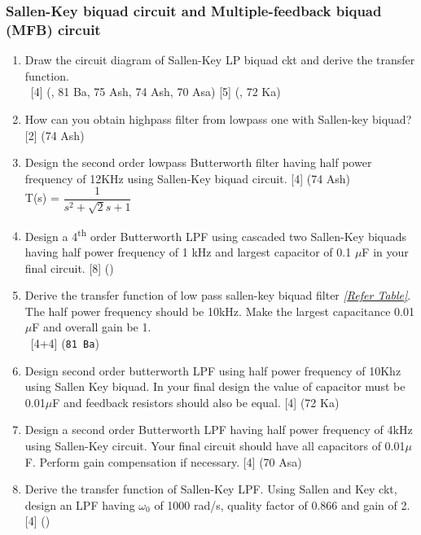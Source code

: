 \documentclass[12pt]{article}
\newcommand{\w}{\(\omega\)}
\newcommand{\enter}{\\\textcolor{white}{1}}
\newcommand{\super}[1]{\textsuperscript{#1}}
\begin{document}
		\subsubsection{Sallen-Key biquad circuit and Multiple-feedback biquad (MFB) circuit}
			\begin{enumerate}
				\item Draw the circuit diagram of Sallen-Key LP biquad ckt and derive the transfer function.
				\enter\hfill [4] (, 81 Ba, 75 Ash, 74 Ash, 70 Asa) [5] (, 72 Ka)

				\item How can you obtain highpass filter from lowpass one with Sallen-key biquad? \hfill [2] (74 Ash)
				
				\item Design the second order lowpass Butterworth filter having half power frequency of 12KHz using Sallen-Key biquad circuit. \hfill [4] (74 Ash)\\
				T(s) = $\dfrac{1}{s^2+\sqrt{2}s+1}$
				
				\item Design a 4\super{th} order Butterworth LPF using cascaded two Sallen-Key biquads having half power frequency of 1 kHz and largest capacitor of 0.1 $\mu$F in your final circuit. \hfill [8] ()

				\item Derive the transfer function of low pass sallen-key biquad filter \textit{[\hyperref[sec:tables_81ba]{Refer Table]}}. The half power frequency should be 10kHz. Make the largest capacitance 0.01$\mu$F and overall gain be 1.
				\enter \hfill [4+4] (\texttt{81 Ba})

				\item Design second order butterworth LPF using half power frequency of 10Khz using Sallen Key biquad. In your final design the value of capacitor must be 0.01$\mu$F and feedback resistors should also be equal. \hfill [4] (72 Ka)

				\item Design a second order Butterworth LPF having half power frequency of 4kHz using Sallen-Key circuit. Your final circuit should have all capacitors of 0.01$\mu$F. Perform gain compensation if necessary. \hfill [4] (70 Asa)

				\item Derive the transfer function of Sallen-Key LPF. Using Sallen and Key ckt, design an LPF having \w$_0$ of 1000 rad/s, quality factor of 0.866 and gain of 2. \hfill [4] ()


\end{enumerate}
\end{document}
